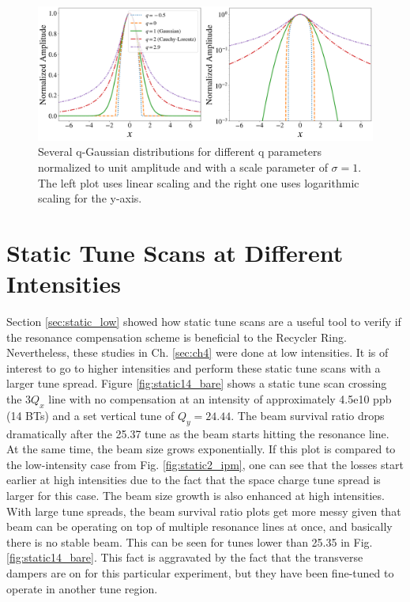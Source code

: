 \begin{figure}[H]
    \centering
    \includegraphics[width=\textwidth,keepaspectratio]{chapter6/qgaussians.png}
    \caption{Several q-Gaussian distributions for different q parameters normalized to unit amplitude and with a scale parameter of $\sigma=1$. The left plot uses linear scaling and the right one uses logarithmic scaling for the y-axis.}
    \label{fig:qgaussians}
\end{figure}


\section{\label{sec:static_high}Static Tune Scans at Different Intensities}

Section \ref{sec:static_low} showed how static tune scans are a useful tool to verify if the resonance compensation scheme is beneficial to the Recycler Ring. Nevertheless, these studies in Ch. \ref{sec:ch4} were done at low intensities. It is of interest to go to higher intensities and perform these static tune scans with a larger tune spread. Figure \ref{fig:static14_bare} shows a static tune scan crossing the $3Q_x$ line with no compensation at an intensity of approximately 4.5e10 ppb (14 BTs) and a set vertical tune of $Q_y=24.44$. The beam survival ratio drops dramatically after the 25.37 tune as the beam starts hitting the resonance line. At the same time, the beam size grows exponentially. If this plot is compared to the low-intensity case from Fig. \ref{fig:static2_ipm}, one can see that the losses start earlier at high intensities due to the fact that the space charge tune spread is larger for this case. The beam size growth is also enhanced at high intensities. With large tune spreads, the beam survival ratio plots get more messy given that beam can be operating on top of multiple resonance lines at once, and basically there is no stable beam. This can be seen for tunes lower than 25.35 in Fig. \ref{fig:static14_bare}. This fact is aggravated by the fact that the transverse dampers are on for this particular experiment, but they have been fine-tuned to operate in another tune region. 

